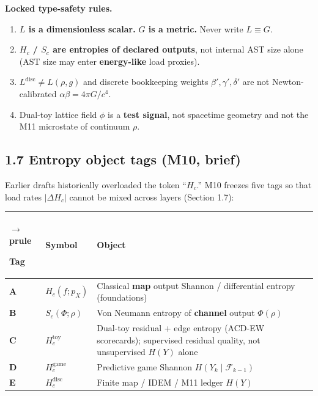 \documentclass[
  11pt,
]{article}
\newcounter{none} %
\providecommand{\tightlist}{%
  \setlength{\itemsep}{0pt}\setlength{\parskip}{0pt}}
\begin{document}
\textbf{Locked type-safety rules.}

\begin{enumerate}
\def\labelenumi{\arabic{enumi}.}
\tightlist
\item
  \textbf{\(L\) is a dimensionless scalar.} \textbf{\(G\) is a metric.} Never write \(L\equiv G\).\\
\item
  \textbf{\(H_c\) / \(S_c\) are entropies of declared outputs}, not internal AST size alone (AST size may enter \textbf{energy-like} load proxies).\\
\item
  \textbf{\(L^{\mathrm{disc}}\neq L(\rho,g)\)} and discrete bookkeeping weights \(\beta',\gamma',\delta'\) are not Newton-calibrated \(\alpha\beta=4\pi G/c^4\).\\
\item
  Dual-toy lattice field \(\phi\) is a \textbf{test signal}, not spacetime geometry and not the M11 microstate of continuum \(\rho\).
\end{enumerate}

\subsection{1.7 Entropy object tags (M10, brief)}\label{entropy-object-tags-m10-brief}

Earlier drafts historically overloaded the token ``\(H_c\).'' M10 freezes five tags so that load rates \(|\Delta H_c|\) cannot be mixed across layers (Section 1.7):

{\def\LTcaptype{none} %
\begin{longtable}[]{@{}
  >{\raggedright\arraybackslash}p{}
  >{\raggedright\arraybackslash}p{}
  >{\raggedright\arraybackslash}p{}@{}}
$\rightarrow$prule\noalign{}
\begin{minipage}[b]{\linewidth}\raggedright
Tag
\end{minipage} & \begin{minipage}[b]{\linewidth}\raggedright
Symbol
\end{minipage} & \begin{minipage}[b]{\linewidth}\raggedright
Object
\end{minipage} \\
\midrule\noalign{}
\endhead
\bottomrule\noalign{}
\endlastfoot
\textbf{A} & \(H_c(f;p_X)\) & Classical \textbf{map} output Shannon / differential entropy (foundations) \\
\textbf{B} & \(S_c(\Phi;\rho)\) & Von Neumann entropy of \textbf{channel} output \(\Phi(\rho)\) \\
\textbf{C} & \(H_c^{\mathrm{toy}}\) & Dual-toy residual + edge entropy (ACD-EW scorecards); supervised residual quality, not unsupervised \(H(Y)\) alone \\
\textbf{D} & \(H_c^{\mathrm{game}}\) & Predictive game Shannon \(H(Y_k\mid\mathcal{F}_{k-1})\) \\
\textbf{E} & \(H_c^{\mathrm{disc}}\) & Finite map / IDEM / M11 ledger \(H(Y)\) \\
\end{longtable}
}
\end{document}
